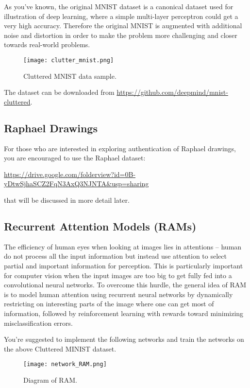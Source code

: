 \documentclass[11pt]{article}
\begin{document}
As you've known, the original MNIST dataset is a canonical dataset used for illustration of deep learning, where a simple multi-layer perceptron could get a very high accuracy. Therefore the original MNIST is augmented with additional noise and distortion in order to make the problem more challenging and closer towards real-world problems. 

\begin{figure}[h]
\center
\texttt{[image: clutter\_mnist.png]}  
\caption{Cluttered MNIST data sample.} 
\label{fig:cmnist}
\end{figure}

The dataset can be downloaded from \url{https://github.com/deepmind/mnist-cluttered}.

\subsection{Raphael Drawings}
For those who are interested in exploring authentication of Raphael drawings, you are encouraged to use the Raphael dataset:

\url{https://drive.google.com/folderview?id=0B-yDtwSjhaSCZ2FqN3AxQ3NJNTA&usp=sharing}

\noindent that will be discussed in more detail later. 

\subsection{Recurrent Attention Models (RAMs)}

The efficiency of human eyes when looking at images lies in attentions -- human do not process all the input information but instead use attention to select partial and important information for perception. This is particularly important for computer vision when the input images are too big to get fully fed into a convolutional neural networks. To overcome this hurdle, the general idea of RAM is to model human attention using recurrent neural networks by dynamically restricting on interesting parts of the image where one can get most of information, followed by reinforcement learning with rewards toward minimizing misclassification errors. 

You're suggested to implement the following networks and train the networks on the above Cluttered MINIST dataset.

\begin{figure}[h]
\center
\texttt{[image: network\_RAM.png]}  
\caption{Diagram of RAM.} 
\label{fig:ram}
\end{figure}
\end{document}
